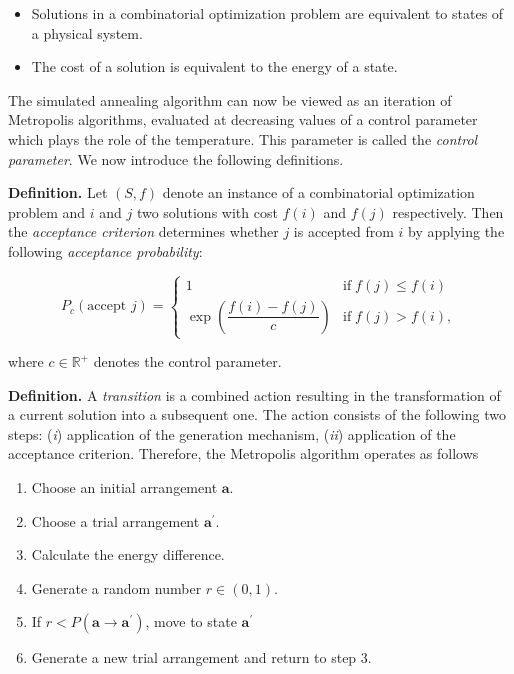 \documentclass[11pt]{article}
\providecommand{\tightlist}{%
      \setlength{\itemsep}{0pt}\setlength{\parskip}{0pt}}
\def\gt{>}
\def\lt{<}
\begin{document}
\begin{itemize}
\tightlist
\item
  Solutions in a combinatorial optimization problem are equivalent to
  states of a physical system.
\item
  The cost of a solution is equivalent to the energy of a state.
\end{itemize}

The simulated annealing algorithm can now be viewed as an iteration of
Metropolis algorithms, evaluated at decreasing values of a control
parameter which plays the role of the temperature. This parameter is
called the \emph{control parameter}. We now introduce the following
definitions.

\textbf{Definition.} Let \((S,f)\) denote an instance of a combinatorial
optimization problem and \(i\) and \(j\) two solutions with cost
\(f(i)\) and \(f(j)\) respectively. Then the \emph{acceptance criterion}
determines whether \(j\) is accepted from \(i\) by applying the
following \emph{acceptance probability}:


\begin{equation}
P_c(\text{accept $j$}) = \begin{cases}
1 & \text{if}\; f(j) \leq f(i) \\
\exp\left(\dfrac{f(i)-f(j)}{c}\right) & \text{if}\; f(j) \gt f(i),
\end{cases}
\end{equation}


where \(c \in \mathbb{R}^+\) denotes the control parameter.

\textbf{Definition.} A \emph{transition} is a combined action resulting
in the transformation of a current solution into a subsequent one. The
action consists of the following two steps: (\emph{i}) application of
the generation mechanism, (\emph{ii}) application of the acceptance
criterion. Therefore, the Metropolis algorithm operates as follows

\begin{enumerate}
\def\labelenumi{\arabic{enumi}.}
\tightlist
\item
  Choose an initial arrangement \(\mathbf{a}\).
\item
  Choose a trial arrangement \(\mathbf{a^\prime}\).
\item
  Calculate the energy difference.
\item
  Generate a random number \(r \in (0,1)\).
\item
  If \(r \lt P(\mathbf{a} \to \mathbf{a^\prime})\), move to state
  \(\mathbf{a^\prime}\)
\item
  Generate a new trial arrangement and return to step 3.
\end{enumerate}
\end{document}
